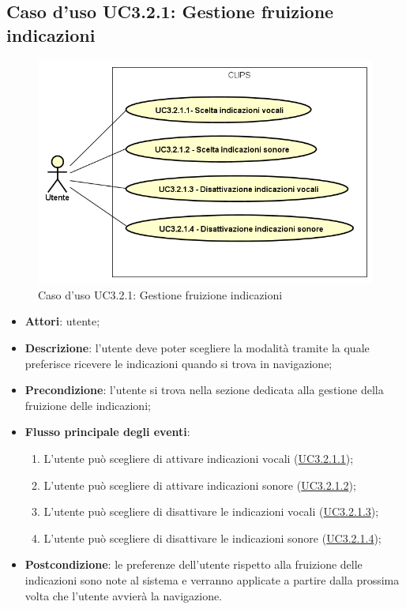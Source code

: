 \documentclass[../AnalisiDeiRequisiti.tex]{subfiles}
\begin{document}
\subsection{Caso d'uso UC3.2.1: Gestione fruizione indicazioni}

        \begin{figure}[!h]
            \centering
            \includegraphics[scale=0.95, width=\textwidth]{img/UC3-2-1.png}
            \caption{Caso d'uso UC3.2.1: Gestione fruizione indicazioni}\label{fig:UC3.2.1} 
        \end{figure}
\begin{itemize}
\item \textbf{Attori}: utente;
\item \textbf{Descrizione}: l'utente deve poter scegliere la modalità tramite la quale preferisce ricevere le indicazioni quando si trova in navigazione; 
      \item \textbf{Precondizione}: l'utente si trova nella sezione dedicata alla gestione della fruizione delle indicazioni;

        \item \textbf{Flusso principale degli eventi}:
          \begin{enumerate}
          \item L'utente può scegliere di attivare indicazioni vocali (\hyperlink{UC3.2.1.1}{UC3.2.1.1});
          \item L'utente può scegliere di attivare indicazioni sonore (\hyperlink{UC3.2.1.2}{UC3.2.1.2});
          \item L'utente può scegliere di disattivare le indicazioni vocali (\hyperlink{UC3.2.1.3}{UC3.2.1.3});
          \item L'utente può scegliere di disattivare le indicazioni sonore (\hyperlink{UC3.2.1.4}{UC3.2.1.4});
      \end{enumerate}
    \item \textbf{Postcondizione}: le preferenze dell'utente rispetto alla fruizione delle indicazioni sono note al sistema e verranno applicate a partire dalla prossima volta che l'utente avvierà la navigazione.
  \end{itemize}
\hypertarget{UC3.2.1.1}{}
\end{document}
